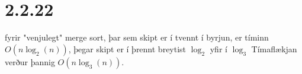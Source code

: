 \documentclass{article}
\begin{document}
\section*{2.2.22}
fyrir "venjulegt" merge sort, þar sem skipt er í tvennt í byrjun, 
er tíminn $O(n\log_2(n))$, 
þegar skipt er í þrennt breytist $\log_2$ yfir í $\log_3$
Tímaflækjan verður þannig $O(n\log_3(n))$.
\end{document}
